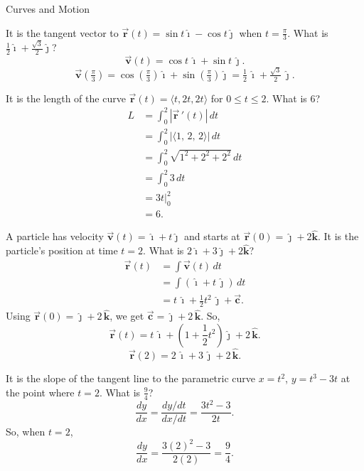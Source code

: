 \documentclass{article}
\newcommand{\bvec}[1]{\vec{\mathbf{#1}}}
\newcommand{\uveci}{\boldsymbol{\hat{\imath}}}
\newcommand{\uvecj}{\boldsymbol{\hat{\jmath}}}
\newcommand{\uveck}{\boldsymbol{\hat{k}}}
\begin{document}
\begin{category}{Curves and Motion}

  \begin{clue}[write]
    It is the tangent vector to $\bvec{r}(t) = \sin t \uveci - \cos t \uvecj$ when $t = \frac{\pi}{3}$.
  \response
    What is $\displaystyle \frac{1}{2} \uveci + \frac{\sqrt{3}}{2}\uvecj$?
  \solution
    \[
    \bvec{v}(t)=\cos t\,\uveci+\sin t\,\uvecj.
    \]
    \[
    \bvec{v}\!\left(\tfrac{\pi}{3}\right)=\cos\!\left(\tfrac{\pi}{3}\right)\uveci+\sin\!\left(\tfrac{\pi}{3}\right)\uvecj
    =\tfrac{1}{2}\,\uveci+\tfrac{\sqrt{3}}{2}\,\uvecj.
    \]
  \end{clue}

  \begin{clue}[say]
    It is the length of the curve $\bvec{r}(t) = \langle t, 2t, 2t\rangle$ for $0 \leq t \leq 2$.
  \response
    What is $6$?
  \solution
    \begin{align*}
    L
    &=\int_0^2 \left|\bvec{r}\,'(t)\right|\,dt \\
    &=\int_0^2 \left|\langle 1,\,2,\,2\rangle\right|\,dt \\
    &=\int_0^2 \sqrt{1^2+2^2+2^2}\,dt \\
    &=\int_0^2 3\,dt \\
    &=\left.3t\right|_0^2 \\
    &=6.
    \end{align*}
  \end{clue}

  \begin{clue}[write]
    A particle has velocity $\bvec{v}(t) = \uveci + t \uvecj$ and starts at $\bvec{r}(0) = \uvecj + 2\uveck$. It is the particle's position at time $t=2$.
  \response
    What is $2 \uveci + 3 \uvecj + 2 \uveck$?
  \solution
    \begin{align*}
    \bvec{r}(t)
    &=\int \bvec{v}(t)\,dt \\
    &=\int (\uveci+t\,\uvecj)\,dt \\
    &=t\,\uveci+\frac{1}{2}t^2\,\uvecj+\bvec{c}.
    \end{align*}
    Using $\bvec{r}(0)=\uvecj+2\,\uveck$, we get $\bvec{c}=\uvecj+2\,\uveck$. So,
    \[
    \bvec{r}(t)=t\,\uveci+\left(1+\frac{1}{2}t^2\right)\uvecj+2\,\uveck.
    \]
    \[
    \bvec{r}(2)=2\,\uveci+3\,\uvecj+2\,\uveck.
    \]
  \end{clue}

  \begin{clue}[say]
    It is the slope of the tangent line to the parametric curve $x=t^2$, $y=t^3-3t$ at the point where $t=2$.
  \response
    What is $\frac{9}{4}$?
  \solution
    \[
    \frac{dy}{dx}=\frac{dy/dt}{dx/dt}=\frac{3t^2-3}{2t}.
    \]
    So, when $t=2$,
    \[
    \frac{dy}{dx}=\frac{3(2)^2-3}{2(2)}=\frac{9}{4}.
    \]
  \end{clue}


\end{category}
\end{document}
